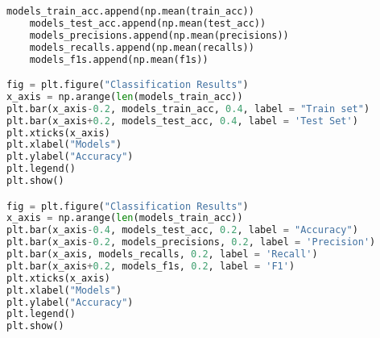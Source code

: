 \begin{lstlisting}[language=Python]
    models_train_acc.append(np.mean(train_acc))
    models_test_acc.append(np.mean(test_acc))
    models_precisions.append(np.mean(precisions))
    models_recalls.append(np.mean(recalls))
    models_f1s.append(np.mean(f1s))

fig = plt.figure("Classification Results")
x_axis = np.arange(len(models_train_acc))
plt.bar(x_axis-0.2, models_train_acc, 0.4, label = "Train set")
plt.bar(x_axis+0.2, models_test_acc, 0.4, label = 'Test Set')
plt.xticks(x_axis)
plt.xlabel("Models")
plt.ylabel("Accuracy")
plt.legend()
plt.show()

fig = plt.figure("Classification Results")
x_axis = np.arange(len(models_train_acc))
plt.bar(x_axis-0.4, models_test_acc, 0.2, label = "Accuracy")
plt.bar(x_axis-0.2, models_precisions, 0.2, label = 'Precision')
plt.bar(x_axis, models_recalls, 0.2, label = 'Recall')
plt.bar(x_axis+0.2, models_f1s, 0.2, label = 'F1')
plt.xticks(x_axis)
plt.xlabel("Models")
plt.ylabel("Accuracy")
plt.legend()
plt.show()
\end{lstlisting}
